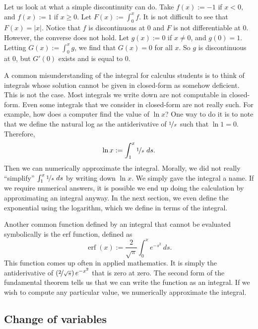 \documentclass[12pt]{book}
\newcommand{\abs}[1]{\left\lvert {#1} \right\rvert}
\theoremstyle{plain}
\theoremstyle{remark}
\theoremstyle{definition}
\theoremstyle{exercise}
\theoremstyle{example}
\begin{document}
Let us look at what a simple discontinuity can do.  Take $f(x) := -1$ if $x
< 0$, and $f(x) := 1$ if $x \geq 0$.  Let $F(x) := \int_0^x f$.  It is not
difficult to see that $F(x) = \abs{x}$.  Notice that $f$ is discontinuous at
$0$ and $F$ is not differentiable at $0$.  However, the converse does not
hold.  %
Let $g(x) := 0$ if $x \not= 0$, and $g(0) = 1$.  Letting $G(x) :=
\int_0^x g$, we find that $G(x) = 0$ for all $x$.  So $g$ is discontinuous
at $0$, but $G'(0)$ exists and is equal to 0.

A common misunderstanding of the integral for calculus students is to
think of integrals whose solution cannot be given in closed-form as somehow
deficient.  This is not the case.  Most integrals we write down are not
computable in closed-form.  Even some integrals that we consider
in closed-form are not really such.  For example, how does a computer find
the value of $\ln x$?  One way to do it is to note that
we define the natural log as the antiderivative of $\nicefrac{1}{x}$
such that $\ln 1 = 0$.
Therefore,
\begin{equation*}
\ln x := \int_1^x \nicefrac{1}{s}~ds .
\end{equation*}
Then we can numerically approximate the integral.  Morally,
we did not really ``simplify'' $\int_1^x \nicefrac{1}{s}~ds$ by
writing down $\ln x$.  We simply gave the integral a name.
If we require numerical answers,
it is possible we end up doing
the calculation by approximating an integral anyway.
In the next section, we even define the exponential using
the logarithm, which we define in terms of the integral.

Another common function defined by an integral that cannot
be evaluated symbolically
is the erf function, defined as
\begin{equation*}
\operatorname{erf}(x) := \frac{2}{\sqrt{\pi}} \int_0^x e^{-s^2} ~ds .
\end{equation*}
This function comes up often in applied mathematics.  It is simply 
the antiderivative of $\left(\nicefrac{2}{\sqrt{\pi}}\right) e^{-x^2}$
that is zero at zero.
The second form of the fundamental theorem tells us that we can write the function
as an integral.  If we wish to compute any particular value, we 
numerically approximate the integral.

\subsection{Change of variables}
\end{document}
